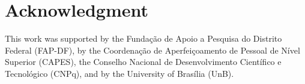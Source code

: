 \documentclass[10pt,conference]{IEEEtran}
\begin{document}











\section*{Acknowledgment}

This work was supported by the Funda\c c\~ao de Apoio a Pesquisa do Distrito Federal (FAP-DF),  by the Coordena\c{c}\~{a}o de Aperfei\c{c}oamento de Pessoal de N\'ivel Superior (CAPES), the Conselho Nacional de Desenvolvimento Cient\'ifico e Tecnol\'ogico (CNPq), and by the University of Bras\'ilia (UnB). 
\end{document}
